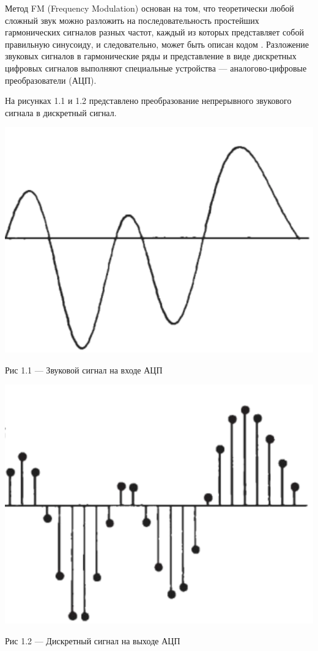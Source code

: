 Метод FM (Frequency Modulation) основан на том, что теоретически любой сложный звук можно разложить на последовательность простейших гармонических сигналов разных частот, каждый из которых представляет собой правильную синусоиду, и следовательно, может быть описан кодом \cite{TypesofSynthesis}. Разложение звуковых сигналов в гармонические ряды и представление в виде дискретных цифровых сигналов выполняют специальные устройства — аналогово-цифровые преобразователи (АЦП).


На рисунках 1.1 и 1.2 представлено преобразование непрерывного звукового сигнала в дискретный сигнал.

\begin{center}
		\includegraphics[scale=0.6]{img/SoundSignal.png}
		
			Рис 1.1 — Звуковой сигнал на входе АЦП
\end{center}

\begin{center}
		\includegraphics[scale=0.6]{img/DigitalSignal.png}
		
			Рис 1.2 — Дискретный сигнал на выходе АЦП
\end{center} 

